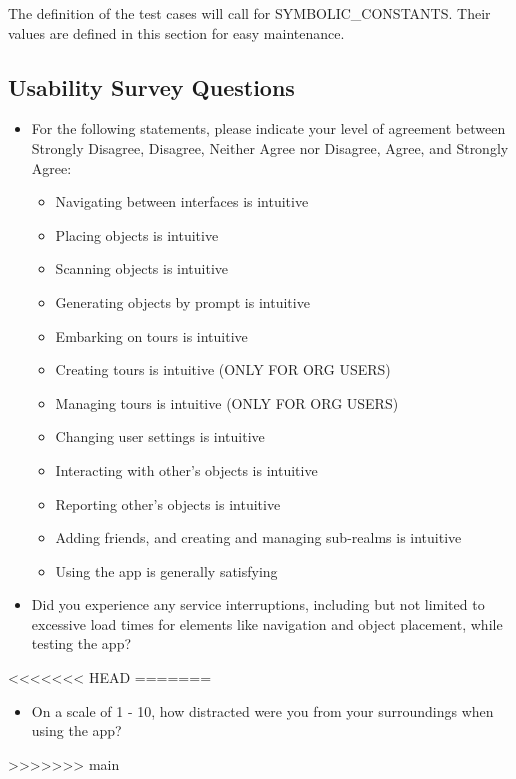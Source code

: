 \documentclass[12pt, titlepage]{article}
\begin{document}
\begin{enumerate}
The definition of the test cases will call for SYMBOLIC\_CONSTANTS.
Their values are defined in this section for easy maintenance.

\subsection{Usability Survey Questions} \label{sub:usability_survey}

\begin{itemize}
    \item For the following statements, please indicate your level of agreement between Strongly Disagree, Disagree, Neither Agree nor Disagree, Agree, and Strongly Agree:
    \begin{itemize}
        \item Navigating between interfaces is intuitive
        \item Placing objects is intuitive
        \item Scanning objects is intuitive
        \item Generating objects by prompt is intuitive
        \item Embarking on tours is intuitive
        \item Creating tours is intuitive (ONLY FOR ORG USERS)
        \item Managing tours is intuitive (ONLY FOR ORG USERS)
        \item Changing user settings is intuitive
        \item Interacting with other's objects is intuitive
        \item Reporting other's objects is intuitive
        \item Adding friends, and creating and managing sub-realms is intuitive
        \item Using the app is generally satisfying
    \end{itemize}
    \item Did you experience any service interruptions, including but not limited to excessive load times for elements like navigation and object placement, while testing the app? \\
\end{itemize}


<<<<<<< HEAD
=======
\begin{itemize}
    \item On a scale of 1 - 10, how distracted were you from your surroundings when using the app?
\end{itemize}
>>>>>>> main


\end{enumerate}
\end{document}
